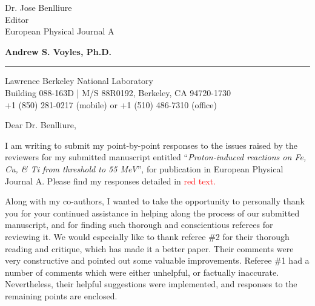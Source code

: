 \documentclass{letter} %
\newcommand{\colornote}[1]{\textcolor{red}{#1}}
\begin{document}
\signature{Andrew S. Voyles}           %
\longindentation=0pt                       %
\let\raggedleft\raggedright                %
\date{13 May, 2020}

 
 
\begin{letter}{Dr. Jose Benlliure \\
Editor \\
European Physical Journal A}


\begin{flushleft}
{\large\bf Andrew S. Voyles, Ph.D.}
\end{flushleft}
\medskip\hrule height 1pt
\begin{flushright}
\hfill Lawrence Berkeley National Laboratory \\
\hfill Building 088-163D  |  M/S 88R0192, Berkeley, CA  94720-1730 \\
\hfill  +1 (850) 281-0217 (mobile) or +1 (510) 486-7310 (office) 
\end{flushright} 
\vfill %

 
\opening{Dear Dr. Benlliure,} 

  \renewcommand*{\thefootnote}{\alph{footnote}}

  \noindent I am writing to submit my point-by-point responses to the issues raised by the reviewers for my submitted manuscript entitled \enquote{\emph{Proton-induced reactions on Fe, Cu, \& Ti from threshold to 55 MeV}},  for publication in European Physical Journal A.  Please find my responses detailed in \colornote{red text.}
  
  \noindent Along with my co-authors, I wanted to take the opportunity to personally thank you for your continued assistance in helping along the process of our submitted manuscript, and for finding such thorough and conscientious referees for reviewing it.  We would especially like to thank  referee \#2 for their thorough reading and critique, which has made it a better paper. Their comments were very constructive and pointed out some valuable improvements. Referee \#1 had a number of comments which were either unhelpful, or factually inaccurate.  Nevertheless, their helpful suggestions were implemented, and responses to the remaining points are enclosed. 
  

\end{letter}
\end{document}
